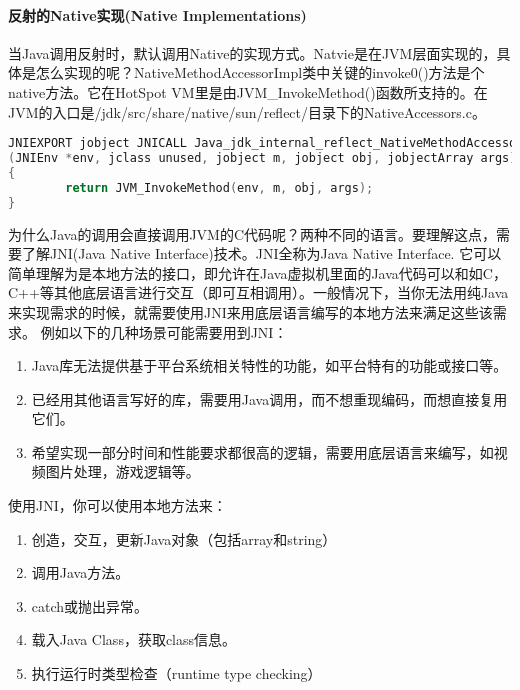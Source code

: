\documentclass[../../../interview-questions.tex]{subfiles}
\begin{document}
\paragraph{反射的Native实现(Native Implementations)}

当Java调用反射时，默认调用Native的实现方式。Natvie是在JVM层面实现的，具体是怎么实现的呢？NativeMethodAccessorImpl类中关键的invoke0()方法是个native方法。它在HotSpot VM里是由JVM\_InvokeMethod()函数所支持的。在JVM的入口是/jdk/src/share/native/sun/reflect/目录下的NativeAccessors.c。

\begin{lstlisting}[language=C]
JNIEXPORT jobject JNICALL Java_jdk_internal_reflect_NativeMethodAccessorImpl_invoke0
(JNIEnv *env, jclass unused, jobject m, jobject obj, jobjectArray args)
{
        return JVM_InvokeMethod(env, m, obj, args);
}
\end{lstlisting}

为什么Java的调用会直接调用JVM的C代码呢？两种不同的语言。要理解这点，需要了解JNI(Java Native Interface)技术。JNI全称为Java Native Interface. 它可以简单理解为是本地方法的接口，即允许在Java虚拟机里面的Java代码可以和如C，C++等其他底层语言进行交互（即可互相调用）。一般情况下，当你无法用纯Java来实现需求的时候，就需要使用JNI来用底层语言编写的本地方法来满足这些该需求。
例如以下的几种场景可能需要用到JNI：

\begin{enumerate}
        \item {Java库无法提供基于平台系统相关特性的功能，如平台特有的功能或接口等。}
        \item{已经用其他语言写好的库，需要用Java调用，而不想重现编码，而想直接复用它们。}
        \item {希望实现一部分时间和性能要求都很高的逻辑，需要用底层语言来编写，如视频图片处理，游戏逻辑等。}
\end{enumerate}

使用JNI，你可以使用本地方法来：

\begin{enumerate}
        \item {创造，交互，更新Java对象（包括array和string）}
        \item {调用Java方法。}
        \item {catch或抛出异常。}
        \item {载入Java Class，获取class信息。}
        \item {执行运行时类型检查（runtime type checking）}
\end{enumerate}
\end{document}
